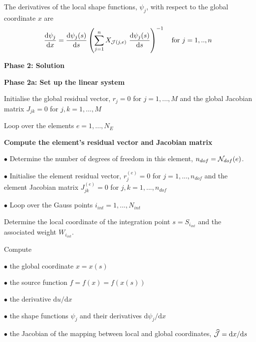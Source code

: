 \begin{DoxyItemize}
The derivatives of the local shape functions, $ \psi_j $, with respect to the global coordinate $ x $ are \[ \frac{\mbox{d} \psi_j}{\mbox{d} x} = \frac{\mbox{d} \psi_j(s)}{\mbox{d} s} \left(\sum_{j=1}^n X_{{\cal J}(j,e)} \ \frac{\mbox{d} \psi_j(s)}{\mbox{d} s} \right)^{-1} \mbox{\ \ \ for $j=1,..,n$} \]

{\bfseries  Phase 2\-: Solution }

{\bfseries  Phase 2a\-: Set up the linear system }
\end{DoxyItemize}


\begin{DoxyItemize}
\item Initialise the global residual vector, $ r_j=0 $ for $j=1,...,M $ and the global Jacobian matrix $ J_{jk}=0 $ for $j,k=1,...,M $
\item Loop over the elements $ e=1,...,N_E$ \par
\par
 \begin{center} {\bfseries  Compute the element's residual vector and Jacobian matrix } \end{center}  \par
 $ \bullet $ Determine the number of degrees of freedom in this element, $ n_{dof}={\cal N}_{dof}(e) $. \par
 $ \bullet $ Initialise the element residual vector, $ r_{j}^{(e)}=0 $ for $j=1,...,n_{dof} $ and the element Jacobian matrix $ J_{jk}^{(e)}=0 $ for $j,k=1,...,n_{dof} $ \par
 $ \bullet $ Loop over the Gauss points $ i_{int}=1,...,N_{int}$ \par

\begin{DoxyItemize}
\item Determine the local coordinate of the integration point $ s = S_{i_{int}} $ and the associated weight $W_{i_{int}}.$
\item Compute \par
 $ \bullet $ the global coordinate $ x = x(s) $\par
 $ \bullet $ the source function $ f = f(x) =f(x(s)) $\par
 $ \bullet $ the derivative $ \mbox{d} u/\mbox{d} x $ \par
 $ \bullet $ the shape functions $ \psi_j $ and their derivatives $ \mbox{d} \psi_j/\mbox{d} x $\par
 $ \bullet $ the Jacobian of the mapping between local and global coordinates, $ \widehat{\cal J} = \mbox{d} x/\mbox{d} s$\par


\end{DoxyItemize}
\end{DoxyItemize}
